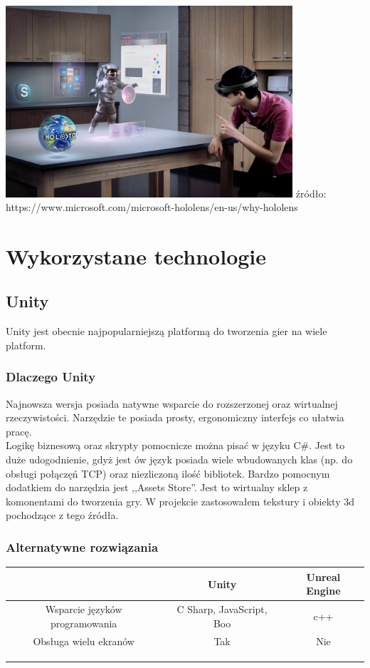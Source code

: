 \documentclass[12pt]{article}
\begin{document}
\begin{center}
\includegraphics[width=0.8\textwidth]{images/hololens.png}
\small {źródło: https://www.microsoft.com/microsoft-hololens/en-us/why-hololens }
\end{center}

\section{Wykorzystane technologie}

\subsection{Unity}
Unity jest obecnie najpopularniejszą platformą do tworzenia gier na wiele platform. 
\subsubsection{Dlaczego Unity}
Najnowsza wersja posiada natywne wsparcie do rozszerzonej oraz wirtualnej rzeczywistości. Narzędzie te posiada prosty, ergonomiczny interfejs co ułatwia pracę.\\
Logikę biznesową oraz skrypty pomocnicze można pisać w języku C\#. Jest to duże udogodnienie, gdyż jest ów język posiada wiele wbudowanych klas (np. do obsługi połączęń TCP) oraz niezliczoną ilość bibliotek.
Bardzo pomocnym dodatkiem do narzędzia jest ,,Assets Store''. Jest to wirtualny sklep z komonentami do tworzenia gry. W projekcie zastosowałem tekstury i obiekty 3d pochodzące z tego źródła.
\subsubsection{Alternatywne rozwiązania}


 \begin{tabular}{|c|c|c|}
 \hline
 \ & Unity & Unreal Engine \\ 
  \hline
 Wsparcie języków programowania & C Sharp, JavaScript, Boo & c++ \\  
  \hline
 Obsługa wielu ekranów & Tak & Nie \\
 \hline  
  &  &  \\
  \hline   
  &  &  \\
  \hline   
  &  &  \\
  \hline   
\end{tabular}
\end{document}
